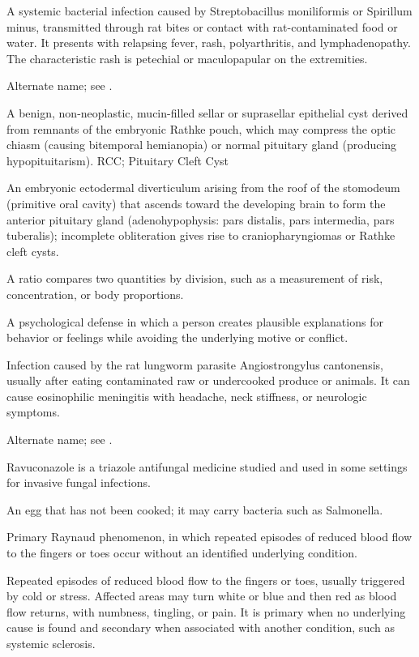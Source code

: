  A systemic bacterial infection caused by Streptobacillus moniliformis or Spirillum
minus, transmitted through rat bites or contact with rat-contaminated food or water. It
presents with relapsing fever, rash, polyarthritis, and lymphadenopathy. The
characteristic rash is petechial or maculopapular on the extremities.

 Alternate name; see .

 A benign, non-neoplastic, mucin-filled sellar or suprasellar epithelial cyst derived from remnants of the embryonic Rathke pouch, which may compress the optic chiasm (causing bitemporal hemianopia) or normal pituitary gland (producing hypopituitarism).
\synonyms
RCC; Pituitary Cleft Cyst

 An embryonic ectodermal diverticulum arising from the roof of the stomodeum (primitive oral cavity) that ascends toward the developing brain to form the anterior pituitary gland (adenohypophysis: pars distalis, pars intermedia, pars tuberalis); incomplete obliteration gives rise to craniopharyngiomas or Rathke cleft cysts.

 A ratio compares two quantities by division, such as a measurement of risk, concentration, or body proportions.

 A psychological defense in which a person creates plausible explanations for behavior or feelings while avoiding the underlying motive or conflict.

 Infection caused by the rat lungworm parasite Angiostrongylus cantonensis, usually after eating contaminated raw or undercooked produce or animals. It can cause eosinophilic meningitis with headache, neck stiffness, or neurologic symptoms.

 Alternate name; see .

 Ravuconazole is a triazole antifungal medicine studied and used in some settings for invasive fungal infections.

 An egg that has not been cooked; it may carry bacteria such as Salmonella.

 Primary Raynaud phenomenon, in which repeated episodes of reduced blood flow to the fingers or toes occur without an identified underlying condition.

 Repeated episodes of reduced blood flow to the fingers or toes, usually triggered by cold or stress. Affected areas may turn white or blue and then red as blood flow returns, with numbness, tingling, or pain. It is primary when no underlying cause is found and secondary when associated with another condition, such as systemic sclerosis.

